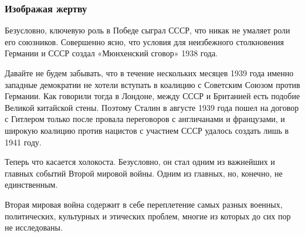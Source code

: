  
 
 
 
 

\subsubsection{Изображая жертву}
\label{sec:02_12_2020.news.ru.lenta_ru.mozzhuhin_andrei.1.pribaltika.izobrazhaja_zhertvu}


Безусловно, ключевую роль в Победе сыграл СССР, что никак не умаляет роли его
союзников. Совершенно ясно, что условия для неизбежного столкновения Германии и
СССР создал «Мюнхенский сговор» 1938 года.

Давайте не будем забывать, что в течение нескольких месяцев 1939 года именно
западные демократии не хотели вступать в коалицию с Советским Союзом против
Германии. Как говорили тогда в Лондоне, между СССР и Британией есть подобие
Великой китайской стены. Поэтому Сталин в августе 1939 года пошел на договор с
Гитлером только после провала переговоров с англичанами и французами, и широкую
коалицию против нацистов с участием СССР удалось создать лишь в 1941 году.

Теперь что касается холокоста. Безусловно, он стал одним из важнейших и главных
событий Второй мировой войны. Одним из главных, но, конечно, не единственным.

Вторая мировая война содержит в себе переплетение самых разных военных,
политических, культурных и этических проблем, многие из которых до сих пор не
исследованы.

